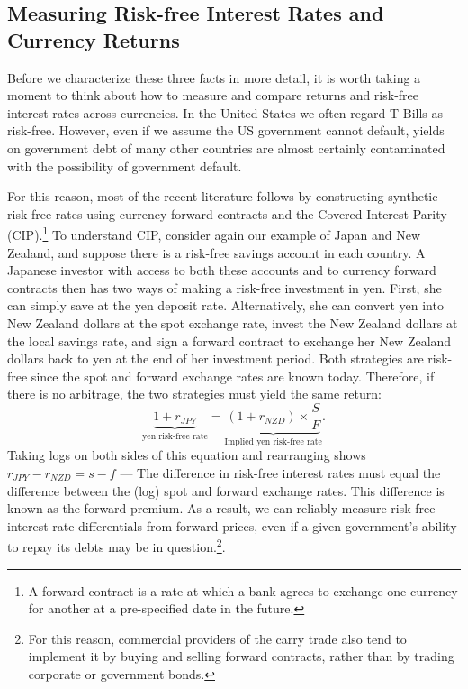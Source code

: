 \documentclass{ar-1col}
\begin{document}
\begin{textbox}[h]\section{Measuring Risk-free Interest Rates and Currency Returns}

Before we characterize these three facts in more detail, it is worth
taking a moment to think about how to measure and compare returns and risk-free
interest rates across currencies. In the United States we often regard
T-Bills as risk-free. However, even if we assume the US government
cannot default, yields on government debt of many other countries are
almost certainly contaminated with the possibility of government
default.

For this reason, most of the recent literature follows \cite{LustigRoussanovVerdelhan2011} by
constructing synthetic risk-free rates using currency forward
contracts and the Covered Interest Parity (CIP).\footnote{A forward
  contract is a rate at which a bank agrees to exchange one currency
  for another at a pre-specified date in the future.} To understand
CIP, consider again our example of Japan and New Zealand, and suppose
there is a risk-free savings account in each country. A Japanese
investor with access to both these accounts and to currency forward
contracts then has two ways of making a risk-free investment in yen.
First, she can simply save at the yen deposit rate. Alternatively, she
can convert yen into New Zealand dollars at the spot exchange rate,
invest the New Zealand dollars at the local savings rate, and sign a
forward contract to exchange her New Zealand dollars back to yen at the
end of her investment period. Both strategies are risk-free since the
spot and forward exchange rates are known today. Therefore, if there
is no arbitrage, the two strategies must yield the same return:
\begin{equation}
  \underbrace{1 + r_{JPY}}_{\text{yen risk-free rate}}
  = \underbrace{
    (1 + r_{NZD}) \times \frac{S}{F}
  }_{\text{Implied yen risk-free rate}}.
\end{equation}
Taking logs on both sides of this equation and rearranging shows
$r_{JPY}-r_{NZD}=s-f$ --- The difference in risk-free interest
rates must equal the difference between the (log) spot and forward
exchange rates. This difference is known as the forward premium. As a
result, we can reliably measure risk-free interest rate differentials
from forward prices, even if a given government's ability to repay its
debts may be in question.\footnote{For this reason, commercial providers of the
carry trade also tend to implement it by buying and selling forward
contracts, rather than by trading corporate or government bonds.}.\end{textbox}
\end{document}

